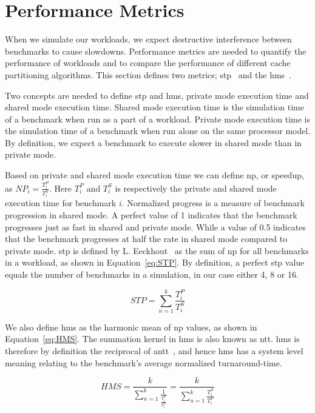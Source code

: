 \section{Performance Metrics}
\label{sec:methodology:metrics}

When we simulate our workloads, we expect destructive interference between benchmarks to cause slowdowns.
Performance metrics are needed to quantify the performance of workloads and to compare the performance of different cache partitioning algorithms.
This section defines two metrics; \gls{stp}~\cite{Eeckhout2010} and the \gls{hms}~\cite{Eeckhout2010}.

Two concepts are needed to define \gls{stp} and \gls{hms}, private mode execution time and shared mode execution time.
Shared mode execution time is the simulation time of a benchmark when run as a part of a workload.
Private mode execution time is the simulation time of a benchmark when run alone on the same processor model.
By definition, we expect a benchmark to execute slower in shared mode than in private mode.

Based on private and shared mode execution time we can define \gls{np}, or speedup, as ${NP}_i = \frac{T^{P}_i}{T^{S}_i}$.
Here $T^{P}_i$ and $T^{S}_i$ is respectively the private and shared mode execution time for benchmark $i$.
Normalized progress is a measure of benchmark progression in shared mode.
A perfect value of 1 indicates that the benchmark progresses just as fast in shared and private mode.
While a value of 0.5 indicates that the benchmark progresses at half the rate in shared mode compared to private mode.
\gls{stp} is defined by L. Eeckhout~\cite{Eeckhout2010} as the sum of \gls{np} for all benchmarks in a workload, as shown in Equation~\ref{eq:STP}.
By definition, a perfect \gls{stp} value equals the number of benchmarks in a simulation, in our case either 4, 8 or 16.

\begin{equation} \label{eq:STP} 
 {STP} = {\sum\limits_{n=1}^{k}}\frac{T^{P}_i}{T^{S}_i}
\end{equation}

We also define \gls{hms} as the harmonic mean of \gls{np} values, as shown in Equation~\ref{eq:HMS}.
The summation kernel in \gls{hms} is also known as \gls{ntt}.
\gls{hms} is therefore by definition the reciprocal of \gls{antt}~\cite{Eeckhout2010}, and hence \gls{hms} has a system level meaning relating to the benchmark's average normalized turnaround-time.

\begin{equation} \label{eq:HMS}
 {HMS} = \frac{k}{{\sum\limits_{n=1}^{k}\frac{1}{\frac{T^{P}_i}{T^{S}_i}}}} = \frac{k}{{\sum\limits_{n=1}^{k}\frac{T^{S}_i}{T^{P}_i}}}
\end{equation}

